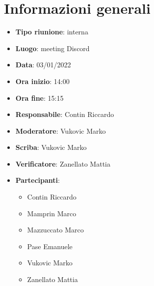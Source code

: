 \section{Informazioni generali}
\begin{itemize}
  \item \textbf{Tipo riunione}: interna
  \item \textbf{Luogo}: meeting Discord
  \item \textbf{Data}: 03/01/2022
  \item \textbf{Ora inizio}: 14:00
  \item \textbf{Ora fine}: 15:15
  \item \textbf{Responsabile}: Contin Riccardo
  \item \textbf{Moderatore}: Vukovic Marko
  \item \textbf{Scriba}: Vukovic Marko
  \item \textbf{Verificatore}: Zanellato Mattia
  \item \textbf{Partecipanti}:
  \begin{itemize}
    \item Contin Riccardo
    \item Mamprin Marco
    \item Mazzuccato Marco
    \item Pase Emanuele
    \item Vukovic Marko
    \item Zanellato Mattia
  \end{itemize}
\end{itemize}
